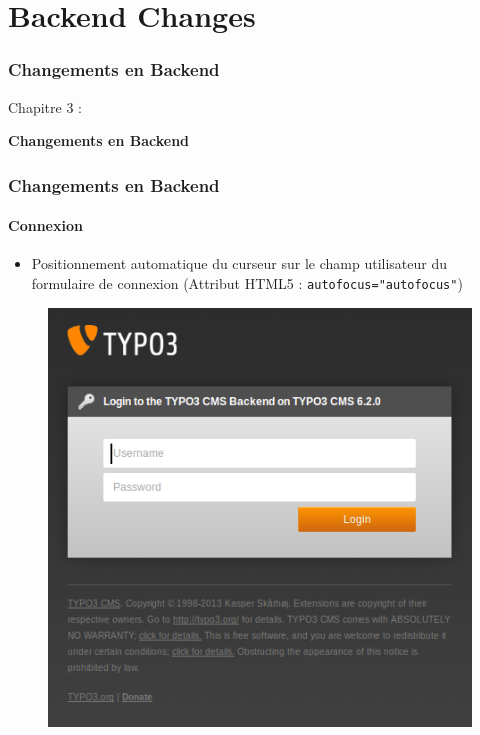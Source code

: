 %

\section{Backend Changes}
\begin{frame}[fragile]
	\frametitle{Changements en Backend}

	\begin{center}\huge{Chapitre 3 :}\end{center}
	\begin{center}\huge{\color{typo3darkgrey}\textbf{Changements en Backend}}\end{center}

\end{frame}


\begin{frame}[fragile]
	\frametitle{Changements en Backend}
	\framesubtitle{Connexion}

 	\begin{itemize}
		\item Positionnement automatique du curseur sur le champ utilisateur du formulaire de connexion\newline
			(Attribut HTML5 : \texttt{autofocus="autofocus"})
	\end{itemize}

	\begin{figure}
		\includegraphics[width=0.4\linewidth]{Images/BackendChanges/BackendLogin.png}
	\end{figure}

\end{frame}

